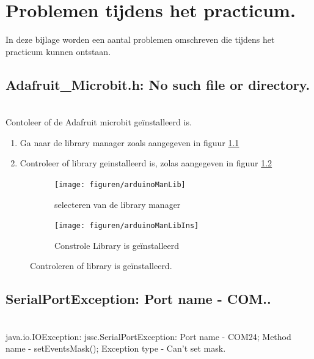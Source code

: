 
\chapter{Problemen tijdens het practicum.}\label{chap:apB}

In deze bijlage worden een aantal problemen omschreven die tijdens het practicum kunnen ontstaan.

\section{Adafruit\_Microbit.h: No such file or directory.}~\\
Contoleer of de Adafruit microbit geïnstalleerd is.
\begin{enumerate}
	\item Ga naar de library manager zoals aangegeven in figuur \ref{fig:ardLibMan}
	\item Controleer of library geinstalleerd is, zolas aangegeven in figuur \ref{fig:ardLibCon}
\end{enumerate}

\begin{figure}[h!]
	 		\centering
	  \begin{center} 	
		\begin{subfigure}[b]{0.45\textwidth}
     \texttt{[image: figuren/arduinoManLib]}
    \caption{selecteren van de library manager }
     \label{fig:ardLibMan}
   \end{subfigure}
\begin{subfigure}[b]{0.54\textwidth}
	     \texttt{[image: figuren/arduinoManLibIns]}
	\caption{Constrole Library is geïnstalleerd }
	\label{fig:ardLibCon}
\end{subfigure}
\captionsetup{justification=centering}
\caption{Controleren of library is geïnstalleerd. }
\label{fig:ardinopr1}
\end{center}

\end{figure}

\section{SerialPortException: Port name - COM..}~\\
java.io.IOException: jssc.SerialPortException: Port name - COM24; Method name - setEventsMask(); Exception type - Can't set mask.

